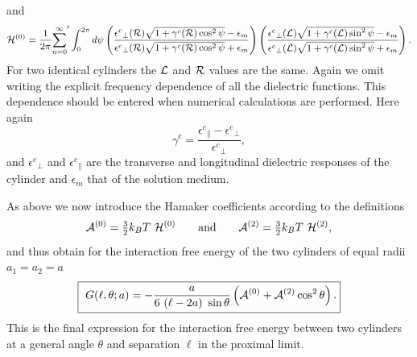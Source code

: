 \documentclass[onecolumn,letterpaper,amsmath,amssymb,floatfix,aps,superscriptaddress]{revtex4}
\begin{document}
 and \begin{equation}
{\cal H}^{(0)}=\frac{1}{2\pi}{\sum_{n=0}^{\infty}}'\int_{0}^{2\pi}d\psi\left(\frac{{{\epsilon^{c}}_{\perp}({\cal R})}\sqrt{1+{\gamma^{c}}({\cal R})\cos^{2}{\psi}}-\epsilon_{m}}{{{\epsilon^{c}}_{\perp}({\cal R})}\sqrt{1+{\gamma^{c}}({\cal R})\cos^{2}{\psi}}+\epsilon_{m}}\right)\left(\frac{{{\epsilon^{c}}_{\perp}({\cal L})}\sqrt{1+{\gamma^{c}}({\cal L})\sin^{2}{\psi}}-\epsilon_{m}}{{{\epsilon^{c}}_{\perp}({\cal L})}\sqrt{1+{\gamma^{c}}({\cal L})\sin^{2}{\psi}}+\epsilon_{m}}\right).\label{sutu22}\end{equation}
 For two identical cylinders the ${\cal L}$ and ${\cal R}$ values
are the same. Again we omit writing the explicit frequency dependence
of all the dielectric functions. This dependence should be entered
when numerical calculations are performed. Here again \begin{equation}
{\gamma^{c}}=\frac{{{\epsilon^{c}}_{\parallel}}-{{\epsilon^{c}}_{\perp}}}{{{\epsilon^{c}}_{\perp}}},
\end{equation}
 and ${\epsilon^{c}}_{\perp}$ and ${\epsilon^{c}}_{\parallel}$ are
the transverse and longitudinal dielectric responses of the cylinder
and $\epsilon_{m}$ that of the solution medium.

As above we now introduce the Hamaker coefficients
according to the definitions \begin{equation}
{\cal A}^{(0)}={\textstyle \frac{3}{2}}k_{B}T~{\cal H}^{(0)}\qquad{\rm and}\qquad{\cal A}^{(2)}={\textstyle \frac{3}{2}}k_{B}T~{\cal H}^{(2)},\end{equation}
 and thus obtain for the interaction free energy of the two cylinders
of equal radii $a_{1}=a_{2}=a$ \begin{equation}
 \fbox{
    $\displaystyle{
G(\ell,\theta;a)=-\frac{a}{6~(\ell - 2a)~\sin{\theta}}\left({\cal A}^{(0)}+{\cal A}^{(2)}\cos^{2}{\theta}\right).}$}\end{equation}
 This is the final expression for the interaction free energy
between two cylinders at a general angle $\theta$ and separation $\ell$
in the proximal limit. 
\end{document}
